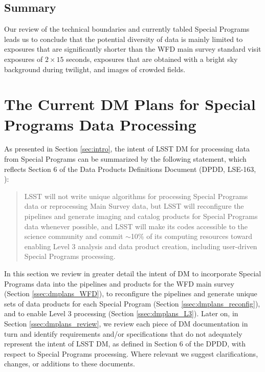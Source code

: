 \documentclass[DM,lsstdraft,toc]{lsstdoc}
\begin{document}
\subsection{Summary}\label{ssec:data_summary}

Our review of the technical boundaries and currently tabled Special Programs leads us to conclude that the potential diversity of data is mainly limited to exposures that are significantly shorter than the WFD main survey standard visit exposures of $2\times15$ seconds, exposures that are obtained with a bright sky background during twilight, and images of crowded fields. 






\clearpage
\section{The Current DM Plans for Special Programs Data Processing} \label{sec:dmplans}

As presented in Section \ref{sec:intro}, the intent of LSST DM for processing data from Special Programs can be summarized by the following statement, which reflects Section 6 of the Data Products Definitions Document (DPDD, LSE-163, \cite{LSE-163}):

\begin{quote}
LSST will not write unique algorithms for processing Special Programs data or reprocessing Main Survey data, but LSST will reconfigure the pipelines and generate imaging and catalog products for Special Programs data whenever possible, and LSST will make its codes accessible to the science community and commit $\sim$10\% of its computing resources toward enabling Level 3 analysis and data product creation, including user-driven Special Programs processing.
\end{quote}

In this section we review in greater detail the intent of DM to incorporate Special Programs data into the pipelines and products for the WFD main survey (Section \ref{ssec:dmplans_WFD}), to reconfigure the pipelines and generate unique sets of data products for each Special Program (Section \ref{ssec:dmplans_reconfig}), and to enable Level 3 processing (Section \ref{ssec:dmplans_L3}). Later on, in Section \ref{ssec:dmplans_review}, we review each piece of DM documentation in turn and identify requirements and/or specifications that do not adequately represent the intent of LSST DM, as defined in Section 6 of the DPDD, with respect to Special Programs processing. Where relevant we suggest clarifications, changes, or additions to these documents.
\end{document}
